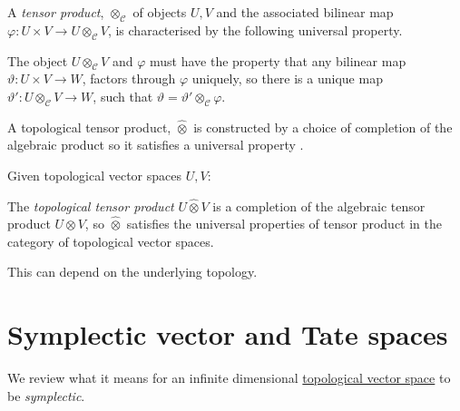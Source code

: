     
        
        \begin{defn}
        A \emph{tensor product}, \( \otimes_{\mathcal{C}}\) of objects \(U,V\) and the associated bilinear map \( \varphi : U \times V \rightarrow U \otimes_{\mathcal{C}} V\), is characterised by the following universal property.
        
        The object \( U \otimes_{\mathcal{C}} V\) and \( \varphi\) must have the property that any bilinear map \( \vartheta : U \times V \rightarrow W\), factors through \( \varphi \) uniquely, so there is a unique map \( \vartheta' :  U \otimes_{\mathcal{C}} V \rightarrow W\), such that
        \( \vartheta = \vartheta' \otimes_{\mathcal{C}} \varphi \).
        \end{defn} 
         
        A topological tensor product, \( \widehat{\otimes}\) is constructed by a choice of completion of the algebraic product so it satisfies a universal property \cite{glock}.
        
        Given topological vector spaces \(U,V\):
        \begin{defn} The \emph{ topological tensor product} \(U \widehat{\otimes}V\) is a completion of the algebraic tensor product \(U \otimes V\), so \( \widehat{\otimes}\) satisfies the universal properties of tensor product in the category of topological vector spaces.
        \end{defn}



        This can depend on the underlying topology. 
        
        
        
        
        
        \section{Symplectic vector and Tate spaces}
        We review what it means for an infinite dimensional \hyperref[defn:topologicalvectspace]{topological vector space} to be \emph{symplectic}.
        
        
        

